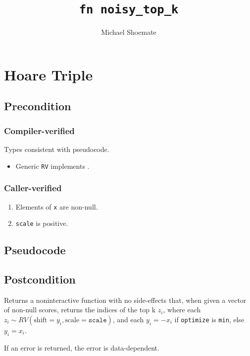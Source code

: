 \documentclass{article}
\title{\texttt{fn noisy\_top\_k}}
\author{Michael Shoemate}
\begin{document}
  
\maketitle 
 
\section{Hoare Triple} 
\subsection*{Precondition} 
\subsubsection*{Compiler-verified}
Types consistent with pseudocode.

\begin{itemize}
    \item Generic \texttt{RV} implements .
\end{itemize}

\subsubsection*{Caller-verified}
\begin{enumerate}
    \item Elements of \texttt{x} are non-null.
    \item \texttt{scale} is positive.
\end{enumerate}
 
\subsection*{Pseudocode} 
\label{sec:python-pseudocode} 
 
 
\subsection*{Postcondition} 

\begin{theorem}
    \label{postcondition}
    Returns a noninteractive function with no side-effects that, 
    when given a vector of non-null scores,
    returns the indices of the top k $z_i$,
    where each $z_i \sim RV(\mathrm{shift}=y_i, \mathrm{scale}=\texttt{scale})$,
    and each $y_i = -x_i$ if \texttt{optimize} is \texttt{min}, else $y_i = x_i$.

    If an error is returned, the error is data-dependent.
\end{theorem}
\end{document}
